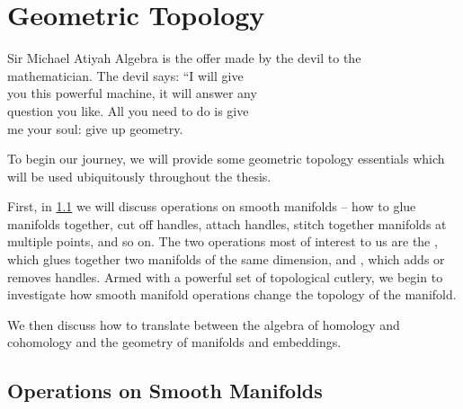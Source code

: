 \chapter{Geometric Topology}\label{chap:fundamentals}

%
%

\begin{epigraph}{20em}{Sir Michael Atiyah}
	Algebra is the offer made by the devil to the \\
	mathematician. The devil says: ``I will give \\
	you this powerful machine, it will answer any \\
	question you like. All you need to do is give\\
	me your soul: give up geometry.
\end{epigraph}

\noindent
To begin our journey, we will provide some geometric topology essentials which will be used ubiquitously throughout the thesis.

First, in \cref{sec:geometric-topology} we will discuss operations on smooth manifolds -- how to glue manifolds together, cut off handles, attach handles, stitch together manifolds at multiple points, and so on. The two operations most of interest to us are the , which glues together two manifolds of the same dimension, and , which adds or removes handles. 
Armed with a powerful set of topological cutlery, we begin to investigate how smooth manifold operations change the topology of the manifold. 

We then discuss how to translate between the algebra of homology and cohomology and the geometry of manifolds and embeddings.


\pagebreak
\section{Operations on Smooth Manifolds}\label{sec:geometric-topology}

